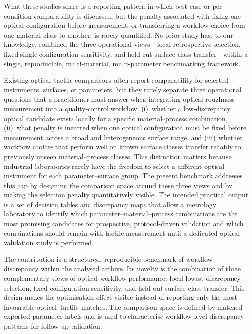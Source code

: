 \documentclass{article}
\begin{document}
What these studies share is a reporting pattern in which best-case or per-condition comparability is discussed, but the penalty associated with fixing one optical configuration before measurement, or transferring a workflow choice from one material class to another, is rarely quantified. No prior study has, to our knowledge, combined the three operational views---local retrospective selection, fixed single-configuration sensitivity, and held-out surface-class transfer---within a single, reproducible, multi-material, multi-parameter benchmarking framework.

Existing optical--tactile comparisons often report comparability for selected instruments, surfaces, or parameters, but they rarely separate three operational questions that a practitioner must answer when integrating optical roughness measurement into a quality-control workflow: (i)~whether a low-discrepancy optical candidate exists locally for a specific material--process combination, (ii)~what penalty is incurred when one optical configuration must be fixed before measurement across a broad and heterogeneous surface range, and (iii)~whether workflow choices that perform well on known surface classes transfer reliably to previously unseen material--process classes. This distinction matters because industrial laboratories rarely have the freedom to select a different optical instrument for each parameter--surface group. The present benchmark addresses this gap by designing the comparison space around these three views and by making the selection penalty quantitatively visible. The intended practical output is a set of decision tables and discrepancy maps that allow a metrology laboratory to identify which parameter--material--process combinations are the most promising candidates for prospective, protocol-driven validation and which combinations should remain with tactile measurement until a dedicated optical validation study is performed.

The contribution is a structured, reproducible benchmark of workflow discrepancy within the analysed archive. Its novelty is the combination of three complementary views of optical workflow performance: local lowest-discrepancy selection, fixed-configuration sensitivity, and held-out surface-class transfer. This design makes the optimisation effect visible instead of reporting only the most favourable optical--tactile matches. The comparison space is defined by matched exported parameter labels and is used to characterise workflow-level discrepancy patterns for follow-up validation.
\end{document}
